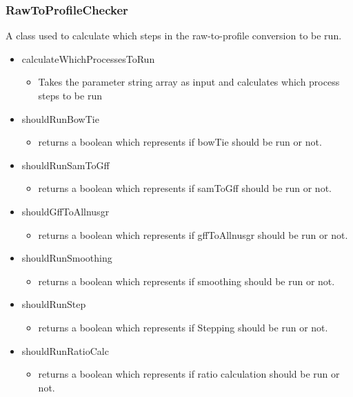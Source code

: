 \subsubsection{RawToProfileChecker}

A class used to calculate which steps in the raw-to-profile conversion to be run.

\begin{itemize}
\item calculateWhichProcessesToRun
\begin{itemize}
\item Takes the parameter string array as input and calculates which process steps to be run
\end{itemize}
\item shouldRunBowTie
\begin{itemize}
\item returns a boolean which represents if bowTie should be run or not.
\end{itemize}
\item shouldRunSamToGff
\begin{itemize}
\item returns a boolean which represents if samToGff should be run or not.
\end{itemize}
\item shouldGffToAllnusgr
\begin{itemize}
\item returns a boolean which represents if gffToAllnusgr should be run or not.
\end{itemize}
\item shouldRunSmoothing
\begin{itemize}
\item returns a boolean which represents if smoothing should be run or not.
\end{itemize}
\item shouldRunStep
\begin{itemize}
\item returns a boolean which represents if Stepping should be run or not.
\end{itemize}
\item shouldRunRatioCalc
\begin{itemize}
\item returns a boolean which represents if ratio calculation should be run or not.
\end{itemize}

\end{itemize}



